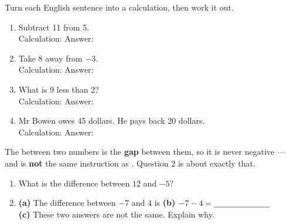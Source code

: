\documentclass[12pt,a4paper]{article}
\begin{document}
\noindent Turn each English sentence into a calculation, then work it out.

\vspace{6pt}
\begin{enumerate}[label=\arabic*., itemsep=11pt]
  \item Subtract 11 from 5. \\[4pt]
        Calculation: \blank[6.2cm] \quad Answer: \blank[2.4cm]
  \item Take 8 away from $-3$. \\[4pt]
        Calculation: \blank[6.2cm] \quad Answer: \blank[2.4cm]
  \item What is 9 less than 2? \\[4pt]
        Calculation: \blank[6.2cm] \quad Answer: \blank[2.4cm]
  \item Mr Bowen owes 45 dollars. He pays back 20 dollars. \\[4pt]
        Calculation: \blank[6.2cm] \quad Answer: \blank[2.4cm]
\end{enumerate}


\begin{wordhelp}
  The  between two numbers is the \textbf{gap} between them, so it is
  never negative --- and  is \textbf{not} the
  same instruction as . Question 2 is about exactly that.
\end{wordhelp}

\begin{enumerate}[label=\arabic*., itemsep=10pt]
  \item What is the difference between $12$ and $-5$? \blank[3.0cm]
  \item \textbf{(a)} The difference between $-7$ and $4$ is \blank[2.4cm]
        \qquad \textbf{(b)} $-7 - 4 = \blank[2.4cm]$ \\[6pt]
        \textbf{(c)} These two answers are not the same. Explain why.
\end{enumerate}

\end{document}
